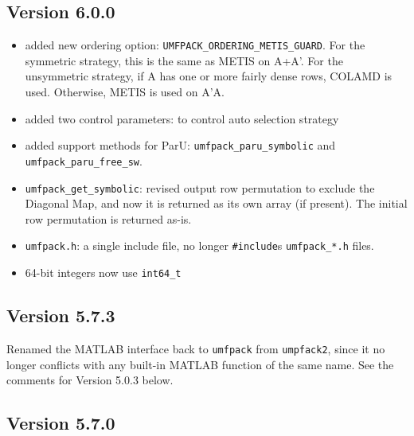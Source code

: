 \documentclass[11pt]{article}
\begin{document}
\subsection{Version 6.0.0}

\begin{itemize}
    \item added new ordering option: \verb'UMFPACK_ORDERING_METIS_GUARD'.  For the
        symmetric strategy, this is the same as METIS on A+A'.  For the
        unsymmetric strategy, if A has one or more fairly dense rows,
        COLAMD is used.  Otherwise, METIS is used on A'A.
    \item added two control parameters: to control auto selection strategy
    \item added support methods for ParU: \verb'umfpack_paru_symbolic' and
        \verb'umfpack_paru_free_sw'.
    \item \verb'umfpack_get_symbolic': revised output row permutation to exclude
        the Diagonal Map, and now it is returned as its own array (if present).
        The initial row permutation is returned as-is.
    \item \verb'umfpack.h': a single include file, no longer \verb'#include's \verb'umfpack_*.h' files.
    \item 64-bit integers now use \verb'int64_t'
\end{itemize}

\subsection{Version 5.7.3}

Renamed the MATLAB interface back to {\tt umfpack} from {\tt umpfack2}, since
it no longer conflicts with any built-in MATLAB function of the same name. 
See the comments for Version 5.0.3 below.

\subsection{Version 5.7.0}
\end{document}
